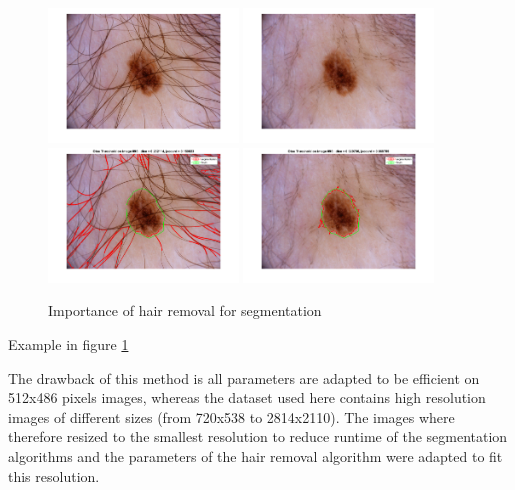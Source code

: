 \documentclass[a4paper,10pt]{article}
\begin{document}
\begin{figure}
	\centering
	\includegraphics[width=0.45\textwidth]{../results/hair-removal/im_095} 
	\includegraphics[width=0.45\textwidth]{../results/hair-removal/imshaved_095} \\
	\includegraphics[width=0.45\textwidth]{../results/hair-removal/otsu_segt_im_095} 
	\includegraphics[width=0.45\textwidth]{../results/hair-removal/otsu_segt_shaved_im_095}
	\label{fig:dullrazor}
	\caption{Importance of hair removal for segmentation}
\end{figure}

Example in figure \ref{fig:dullrazor}

The drawback of this method is all parameters are adapted to be efficient on 512x486 pixels images, whereas the dataset used here contains high resolution images of different sizes (from 720x538 to 2814x2110). The images where therefore resized to the smallest resolution to reduce runtime of the segmentation algorithms and the parameters of the hair removal algorithm were adapted to fit this resolution.
\end{document}
